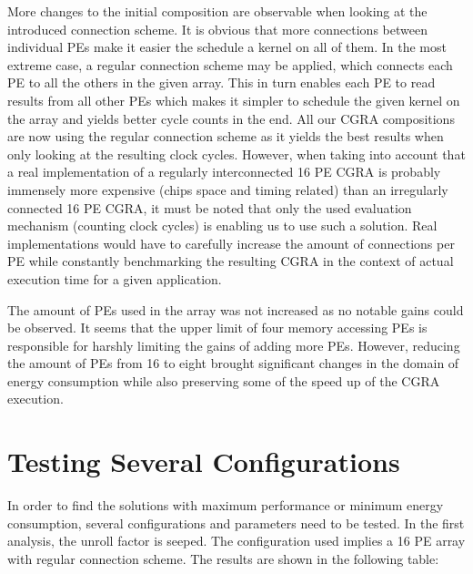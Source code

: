 		More changes to the initial composition are observable when looking at the introduced connection scheme. It is obvious that more connections between individual PEs make it easier the schedule a kernel on all of them. In the most extreme case, a regular connection scheme may be applied, which connects each PE to all the others in the given array. This in turn enables each PE to read results from all other PEs which makes it simpler to schedule the given kernel on the array and yields better cycle counts in the end. All our CGRA compositions are now using the regular connection scheme as it yields the best results when only looking at the resulting clock cycles. However, when taking into account that a real implementation of a regularly interconnected 16 PE CGRA is probably immensely more expensive (chips space and timing related) than an irregularly connected 16 PE CGRA, it must be noted that only the used evaluation mechanism (counting clock cycles) is enabling us to use such a solution. Real implementations would have to carefully increase the amount of connections per PE while constantly benchmarking the resulting CGRA in the context of actual execution time for a given application.\newline
		
		The amount of PEs used in the array was not increased as no notable gains could be observed. It seems that the upper limit of four memory accessing PEs is responsible for harshly limiting the gains of adding more PEs. 
		However, reducing the amount of PEs from \num{16} to eight brought significant changes in the domain of energy consumption while also preserving some of the speed up of the CGRA execution.
	



	\section{Testing Several Configurations} %
	\label{sec:impl_max_perf}
		In order to find the solutions with maximum performance or minimum energy consumption, several configurations and parameters need to be tested. 
		In the first analysis, the unroll factor is seeped. The configuration used implies a 16 PE array with regular connection scheme. The results are shown in the following table:


